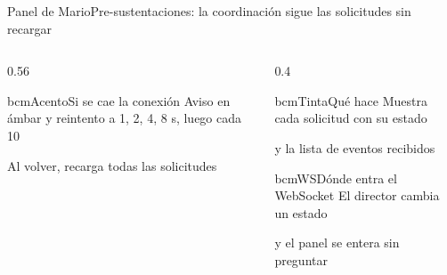 \begin{frame}{Panel de Mario}{Pre-sustentaciones: la coordinación sigue las solicitudes sin recargar}
  \begin{columns}[T]
    \begin{column}{0.56\textwidth}
      \begin{tarjeta}{bcmAcento}{Si se cae la conexión}
        \footnotesize Aviso en ámbar y reintento a 1, 2, 4, 8 s, luego cada 10\par
        Al volver, recarga todas las solicitudes
      \end{tarjeta}
    \end{column}
    \begin{column}{0.4\textwidth}
      \begin{tarjeta}{bcmTinta}{Qué hace}
        \footnotesize Muestra cada solicitud con su estado\par
        y la lista de eventos recibidos
      \end{tarjeta}
      \begin{tarjeta}{bcmWS}{Dónde entra el WebSocket}
        \footnotesize El director cambia un estado\par
        y el panel se entera sin preguntar
      \end{tarjeta}
    \end{column}
  \end{columns}
\end{frame}
